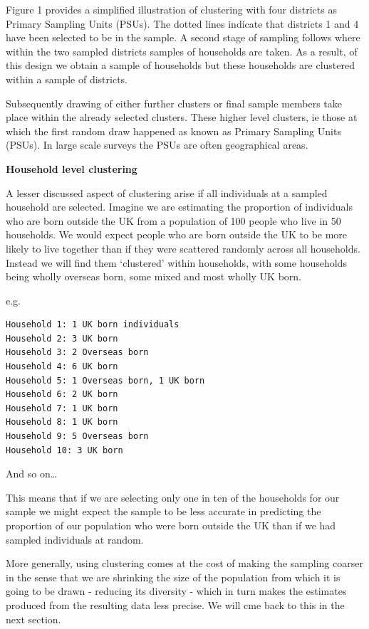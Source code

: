\documentclass[
  14,
  a4paper,
  DIV=11,
  numbers=noendperiod]{scrartcl}
\begin{document}
Figure 1 provides a simplified illustration of clustering with four
districts as Primary Sampling Units (PSUs). The dotted lines indicate
that districts 1 and 4 have been selected to be in the sample. A second
stage of sampling follows where within the two sampled districts samples
of households are taken. As a result, of this design we obtain a sample
of households but these households are clustered within a sample of
districts.

Subsequently drawing of either further clusters or final sample members
take place within the already selected clusters. These higher level
clusters, ie those at which the first random draw happened as known as
Primary Sampling Units (PSUs). In large scale surveys the PSUs are often
geographical areas.

\textbf{Household level clustering}

A lesser discussed aspect of clustering arise if all individuals at a
sampled household are selected. Imagine we are estimating the proportion
of individuals who are born outside the UK from a population of 100
people who live in 50 households. We would expect people who are born
outside the UK to be more likely to live together than if they were
scattered randomly across all households. Instead we will find them
`clustered' within households, with some households being wholly
overseas born, some mixed and most wholly UK born.

e.g.~

\begin{verbatim}
Household 1: 1 UK born individuals 
Household 2: 3 UK born 
Household 3: 2 Overseas born 
Household 4: 6 UK born 
Household 5: 1 Overseas born, 1 UK born 
Household 6: 2 UK born 
Household 7: 1 UK born 
Household 8: 1 UK born 
Household 9: 5 Overseas born 
Household 10: 3 UK born 
\end{verbatim}

And so on\ldots{}

This means that if we are selecting only one in ten of the households
for our sample we might expect the sample to be less accurate in
predicting the proportion of our population who were born outside the UK
than if we had sampled individuals at random.

More generally, using clustering comes at the cost of making the
sampling coarser in the sense that we are shrinking the size of the
population from which it is going to be drawn - reducing its diversity -
which in turn makes the estimates produced from the resulting data less
precise. We will cme back to this in the next section.
\end{document}
